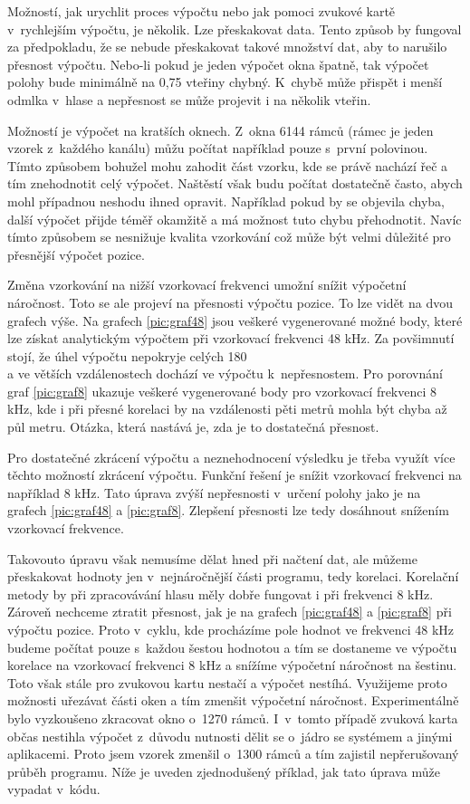 Možností, jak urychlit proces výpočtu nebo jak pomoci zvukové kartě v~rychlejším výpočtu, je několik. Lze přeskakovat data. Tento způsob by fungoval za předpokladu, že se nebude přeskakovat takové množství dat, aby to narušilo přesnost výpočtu. Nebo-li pokud je jeden výpočet okna špatně, tak výpočet polohy bude minimálně na 0,75 vteřiny chybný. K~chybě může přispět i menší odmlka v~hlase a nepřesnost se může projevit i na několik vteřin.

Možností je výpočet na kratších oknech. Z~okna 6144 rámců (rámec je jeden vzorek z~každého kanálu) můžu počítat například pouze s~první polovinou. Tímto způsobem bohužel mohu zahodit část vzorku, kde se právě nachází řeč a tím znehodnotit celý výpočet. Naštěstí však budu počítat dostatečně často, abych mohl případnou neshodu ihned opravit. Například pokud by se objevila chyba, další výpočet přijde téměř okamžitě a má možnost tuto chybu přehodnotit. Navíc tímto způsobem se nesnižuje kvalita vzorkování což může být velmi důležité pro přesnější výpočet pozice.

Změna vzorkování na nižší vzorkovací frekvenci umožní snížit výpočetní náročnost. Toto se ale projeví na přesnosti výpočtu pozice. To lze vidět na dvou grafech výše. Na grafech \ref{pic:graf48} jsou veškeré vygenerované možné body, které lze získat analytickým výpočtem při vzorkovací frekvenci 48 kHz. Za povšimnutí stojí, že úhel výpočtu nepokryje celých 180\degree \\ a ve větších vzdálenostech dochází ve výpočtu k~nepřesnostem. Pro porovnání graf \ref{pic:graf8} ukazuje veškeré vygenerované body pro vzorkovací frekvenci 8 kHz, kde i při přesné korelaci by na vzdálenosti pěti metrů mohla být chyba až půl metru. Otázka, která nastává je, zda je to dostatečná přesnost.

Pro dostatečné zkrácení výpočtu a neznehodnocení výsledku je třeba využít více těchto možností zkrácení výpočtu. Funkční řešení je snížit vzorkovací frekvenci na například 8 kHz. Tato úprava zvýší nepřesnosti v~určení polohy jako je na grafech \ref{pic:graf48} a \ref{pic:graf8}. Zlepšení přesnosti lze tedy dosáhnout snížením vzorkovací frekvence.

Takovouto úpravu však nemusíme dělat hned při načtení dat, ale můžeme přeskakovat hodnoty jen v~nejnáročnější části programu, tedy korelaci. Korelační metody by při zpracovávání hlasu měly dobře fungovat i při frekvenci 8 kHz. Zároveň nechceme ztratit přesnost, jak je na grafech \ref{pic:graf48} a \ref{pic:graf8} při výpočtu pozice. Proto v~cyklu, kde procházíme pole hodnot ve frekvenci 48 kHz budeme počítat pouze s~každou šestou hodnotou a tím se dostaneme ve výpočtu korelace na vzorkovací frekvenci 8 kHz a snížíme výpočetní náročnost na šestinu. Toto však stále pro zvukovou kartu nestačí a výpočet nestíhá. Využijeme proto možnosti uřezávat části oken a tím zmenšit výpočetní náročnost. Experimentálně bylo vyzkoušeno zkracovat okno o~1270 rámců. I~v~tomto případě zvuková karta občas nestihla výpočet z~důvodu nutnosti dělit se o~jádro se systémem a jinými aplikacemi. Proto jsem vzorek zmenšil o~1300 rámců a tím zajistil nepřerušovaný průběh programu. Níže je uveden zjednodušený příklad, jak tato úprava může vypadat v~kódu.

